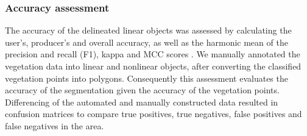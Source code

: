 \subsubsection{Accuracy assessment}
The accuracy of the delineated linear objects was assessed by calculating the user’s, producer’s and overall accuracy, as well as the harmonic mean of the precision and recall (F1), kappa and MCC scores \citep{congalton2008assessing}. We manually annotated the vegetation data into linear and nonlinear objects, after converting the classified vegetation points into polygons. Consequently this assessment evaluates the accuracy of the segmentation given the accuracy of the vegetation points. Differencing of the automated and manually constructed data resulted in confusion matrices to compare true positives, true negatives, false positives and false negatives in the area.